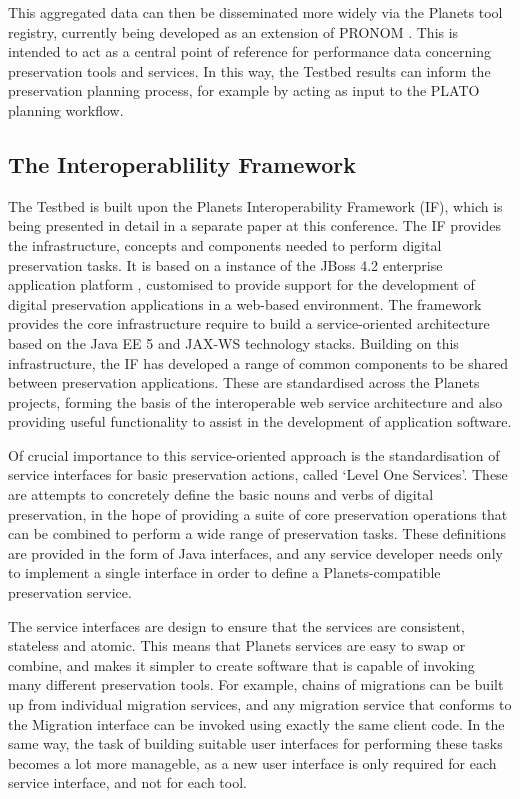 \documentclass{article}
\begin{document}
This aggregated data can then be disseminated more widely via the Planets tool
registry, currently being developed as an extension of PRONOM \cite{pronom}. 
This is intended to act as a central point of reference for performance data
concerning preservation tools and services. In this way, the Testbed results can
inform the preservation planning process, for example by acting as input to the
PLATO planning workflow.

\subsection{The Interoperablility Framework}
The Testbed is built upon the Planets Interoperability Framework (IF), which is
being presented in detail in a separate paper at this conference.   The IF
provides the infrastructure, concepts and components needed to perform digital
preservation tasks.  It is based on a instance of the JBoss 4.2 enterprise
application platform \cite{sw-jboss}, customised to provide support for the
development of digital preservation applications in a web-based environment.  The
framework provides the core infrastructure require to build a service-oriented
architecture based on the Java EE 5 \cite{sw-jee5} and JAX-WS \cite{sw-jaxws}
technology stacks. Building on this infrastructure, the IF has developed a range
of common components to be shared between preservation applications. These are
standardised across the Planets projects, forming the basis of the interoperable
web service architecture and also providing useful functionality to assist in the
development of application software.

Of crucial importance to this service-oriented approach is the standardisation of
service interfaces for basic preservation actions, called `Level One Services'.
These are attempts to concretely define the basic nouns and verbs of digital
preservation, in the hope of providing a suite of core preservation operations
that can be combined to perform a wide range of preservation tasks. These
definitions are provided in the form of Java interfaces, and any service
developer needs only to implement a single interface in order to define a
Planets-compatible preservation service.

The service interfaces are design to ensure that the services are consistent,
stateless and atomic. This means that Planets services are easy to swap or
combine, and makes it simpler to create software that is capable of invoking many
different preservation tools. For example, chains of migrations can be built up
from individual migration services, and any migration service that conforms to
the Migration interface can be invoked using exactly the same client code. In the
same way, the task of building suitable user interfaces for performing these
tasks becomes a lot more manageble, as a new user interface is only required for
each service interface, and not for each tool.
\end{document}

